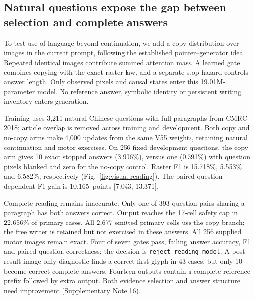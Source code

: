 \documentclass[12pt,a4paper]{article}
\newcommand{\QaExact}{3.906}
\newcommand{\QaFone}{15.718}
\newcommand{\QaBlankExact}{0.391}
\newcommand{\QaBlankFone}{5.553}
\newcommand{\QaControlFone}{6.582}
\newcommand{\QaQuestionGain}{10.165}
\newcommand{\QaQuestionLow}{7.043}
\newcommand{\QaQuestionHigh}{13.371}
\newcommand{\QaDecision}{reject\_reading\_model}
\begin{document}
\subsection*{Natural questions expose the gap between selection and complete answers}
To test use of language beyond continuation, we add a copy distribution over
images in the current prompt, following the established pointer--generator
idea\cite{pointer}. Repeated identical images contribute summed attention
mass. A learned gate combines copying with the exact raster law, and a
separate stop hazard controls answer length. Only observed pixels and causal
states enter this 19.01M-parameter model. No reference answer, symbolic
identity or persistent writing inventory enters generation.

Training uses 3,211 natural Chinese questions with full paragraphs from
CMRC 2018\cite{cmrc}; article overlap is removed across training and development.
Both copy and no-copy arms make 4,000 updates from the same V55 weights,
retaining natural continuation and motor exercises. On 256 fixed development
questions, the copy arm gives 10 exact stopped answers (\QaExact\%), versus
one (\QaBlankExact\%) with question pixels blanked and zero for the no-copy
control. Raster F1 is \QaFone\%, \QaBlankFone\% and \QaControlFone\%,
respectively (Fig.~\ref{fig:visual-reading}). The paired question-dependent
F1 gain is \QaQuestionGain\ points [\QaQuestionLow, \QaQuestionHigh].

Complete reading remains inaccurate. Only one of 393 question pairs sharing
a paragraph has both answers correct. Output reaches the 17-cell safety cap
in 22.656\% of primary cases. All 2,677 emitted primary cells use the copy
branch; the free writer is retained but not exercised in these answers.
All 256 supplied motor images remain exact. Four of seven gates pass, failing
answer accuracy, F1 and paired-question correctness; the decision is
\texttt{\QaDecision}. A post-result image-only diagnostic finds a correct
first glyph in 43 cases, but only 10 become correct complete answers. Fourteen
outputs contain a complete reference prefix followed by extra output. Both
evidence selection and answer structure need improvement (Supplementary Note 16).

\end{document}
